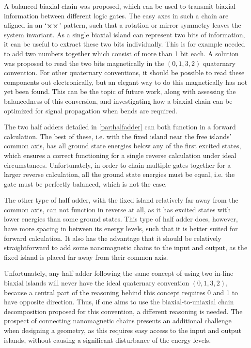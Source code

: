 \documentclass[11pt,a4paper,english,twoside]{article}
\begin{document}
A balanced biaxial chain was proposed, which can be used to transmit biaxial information between different logic gates. The easy axes in such a chain are aligned in an `$\cross \cross$' pattern, such that a rotation or mirror symmetry leaves the system invariant. As a single biaxial island can represent two bits of information, it can be useful to extract these two bits individually. This is for example needed to add two numbers together which consist of more than 1 bit each. A solution was proposed to read the two bits magnetically in the $(0,1,3,2)$ quaternary convention. For other quaternary conventions, it should be possible to read these components out electronically, but an elegant way to do this magnetically has not yet been found. This can be the topic of future work, along with assessing the balancedness of this conversion, and investigating how a biaxial chain can be optimized for signal propagation when bends are required. \par
The two half adders detailed in \cref{par:halfadder} can both function in a forward calculation. The best of these, i.e. with the fixed island near the free islands' common axis, has all ground state energies below any of the first excited states, which ensures a correct functioning for a single reverse calculation under ideal circumstances. Unfortunately, in order to chain multiple gates together for a larger reverse calculation, all the ground state energies must be equal, i.e. the gate must be perfectly balanced, which is not the case. \par
The other type of half adder, with the fixed island relatively far away from the common axis, can not function in reverse at all, as it has excited states with lower energies than some ground states. This type of half adder does, however, have more spacing in between its energy levels, such that it is better suited for forward calculation. It also has the advantage that it should be relatively straightforward to add some nanomagnetic chains to the input and output, as the fixed island is placed far away from their common axis. \par
Unfortunately, any half adder following the same concept of using two in-line biaxial islands will never have the ideal quaternary convention $(0,1,3,2)$, because a central part of the reasoning behind this concept requires 0 and 1 to have opposite direction. Thus, if one aims to use the biaxial-to-uniaxial chain decomposition proposed for this convention, a different reasoning is needed. The prospect of connecting nanomagnetic chains presents an additional challenge when designing a geometry, as this requires easy access to the input and output islands, without causing a significant disturbance of the energy levels. \par
\end{document}

